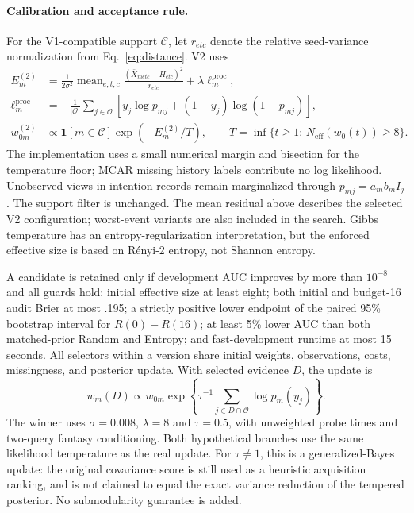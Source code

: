 \paragraph{Calibration and acceptance rule.}
For the V1-compatible support $\mathcal C$, let $r_{etc}$ denote the relative seed-variance normalization from Eq.~\eqref{eq:distance}. V2 uses
\begin{align}
 E_m^{(2)}&=\frac{1}{2\sigma^2}\operatorname{mean}_{e,t,c}
 \frac{(\bar X_{metc}-H_{etc})^2}{r_{etc}}+\lambda\ell_m^{\mathrm{proc}},\\
 \ell_m^{\mathrm{proc}}&=-\frac{1}{|\mathcal O|}\sum_{j\in\mathcal O}
 [y_j\log p_{mj}+(1-y_j)\log(1-p_{mj})],\\
 w_{0m}^{(2)}&\propto\mathbf1[m\in\mathcal C]\exp(-E_m^{(2)}/T),\qquad
 T=\inf\{t\geq1:\,N_{\mathrm{eff}}(w_0(t))\geq8\}.
 \label{eq:v2-calibration}
\end{align}
The implementation uses a small numerical margin and bisection for the temperature floor; MCAR missing history labels contribute no log likelihood. Unobserved views in intention records remain marginalized through $p_{mj}=a_mb_m I_j$. The support filter is unchanged. The mean residual above describes the selected V2 configuration; worst-event variants are also included in the search. Gibbs temperature has an entropy-regularization interpretation, but the enforced effective size is based on R\'enyi-2 entropy, not Shannon entropy.

A candidate is retained only if development AUC improves by more than $10^{-8}$ and all guards hold: initial effective size at least eight; both initial and budget-16 audit Brier at most .195; a strictly positive lower endpoint of the paired 95\% bootstrap interval for $R(0)-R(16)$; at least 5\% lower AUC than both matched-prior Random and Entropy; and fast-development runtime at most 15 seconds. All selectors within a version share initial weights, observations, costs, missingness, and posterior update. With selected evidence $D$, the update is
\begin{equation}
 w_m(D)\propto w_{0m}\exp\!\left\{\tau^{-1}
 \sum_{j\in D\cap\mathcal O}\log p_m(y_j)\right\}.
 \label{eq:v2-update}
\end{equation}
The winner uses $\sigma=0.008$, $\lambda=8$ and $\tau=0.5$, with unweighted probe times and two-query fantasy conditioning. Both hypothetical branches use the same likelihood temperature as the real update. For $\tau\ne1$, this is a generalized-Bayes update: the original covariance score is still used as a heuristic acquisition ranking, and is not claimed to equal the exact variance reduction of the tempered posterior. No submodularity guarantee is added.

